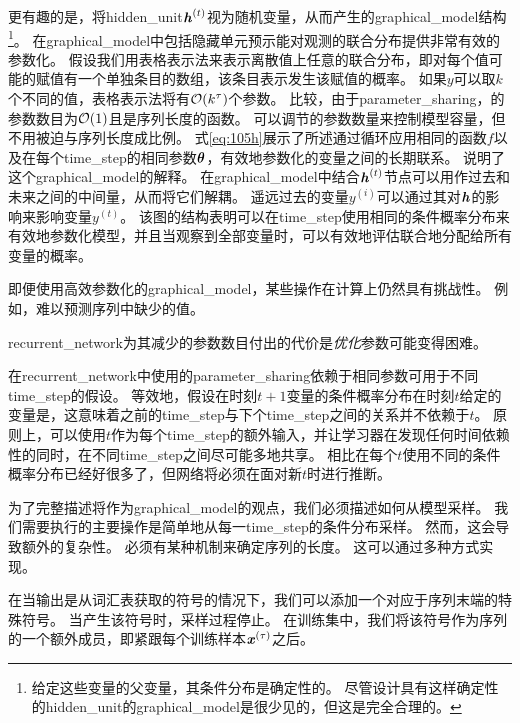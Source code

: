 
更有趣的是，将\gls{hidden_unit}$\boldsymbol{\mathit{h}}^{(t)}$视为随机变量，从而产生的\gls{graphical_model}结构\footnote{给定这些变量的父变量，其条件分布是确定性的。
尽管设计具有这样确定性的\gls{hidden_unit}的\gls{graphical_model}是很少见的，但这是完全合理的。}。
在\gls{graphical_model}中包括隐藏单元预示能对观测的联合分布提供非常有效的参数化。
假设我们用表格表示法来表示离散值上任意的联合分布，即对每个值可能的赋值有一个单独条目的数组，该条目表示发生该赋值的概率。
如果$y$可以取$k$个不同的值，表格表示法将有$\mathcal{O}(k^\tau)$个参数。
比较，由于\gls{parameter_sharing}，的参数数目为$\mathcal{O}(1)$且是序列长度的函数。
可以调节的参数数量来控制模型容量，但不用被迫与序列长度成比例。
式\eqref{eq:105h}展示了所述通过循环应用相同的函数$f$以及在每个\gls{time_step}的相同参数$\boldsymbol{\theta}$，有效地参数化的变量之间的长期联系。
说明了这个\gls{graphical_model}的解释。
在\gls{graphical_model}中结合$\boldsymbol{\mathit{h}}^{(t)}$节点可以用作过去和未来之间的中间量，从而将它们解耦。
遥远过去的变量$y^{(i)}$可以通过其对$\boldsymbol{\mathit{h}}$的影响来影响变量$y^{(t)}$。
该图的结构表明可以在\gls{time_step}使用相同的条件概率分布来有效地参数化模型，并且当观察到全部变量时，可以有效地评估联合地分配给所有变量的概率。


即便使用高效参数化的\gls{graphical_model}，某些操作在计算上仍然具有挑战性。
例如，难以预测序列中缺少的值。

\gls{recurrent_network}为其减少的参数数目付出的代价是\emph{优化}参数可能变得困难。

在\gls{recurrent_network}中使用的\gls{parameter_sharing}依赖于相同参数可用于不同\gls{time_step}的假设。
等效地，假设在时刻$t +1$变量的条件概率分布在时刻$t$给定的变量是，这意味着之前的\gls{time_step}与下个\gls{time_step}之间的关系并不依赖于$t$。
原则上，可以使用$t$作为每个\gls{time_step}的额外输入，并让学习器在发现任何时间依赖性的同时，在不同\gls{time_step}之间尽可能多地共享。
相比在每个$t$使用不同的条件概率分布已经好很多了，但网络将必须在面对新$t$时进行推断。

为了完整描述将作为\gls{graphical_model}的观点，我们必须描述如何从模型采样。
我们需要执行的主要操作是简单地从每一\gls{time_step}的条件分布采样。
然而，这会导致额外的复杂性。
必须有某种机制来确定序列的长度。
这可以通过多种方式实现。

在当输出是从词汇表获取的符号的情况下，我们可以添加一个对应于序列末端的特殊符号\citep{schmidhuber2012self}。
当产生该符号时，采样过程停止。
在训练集中，我们将该符号作为序列的一个额外成员，即紧跟每个训练样本$\boldsymbol{\mathit{x}}^{(\tau)}$之后。


